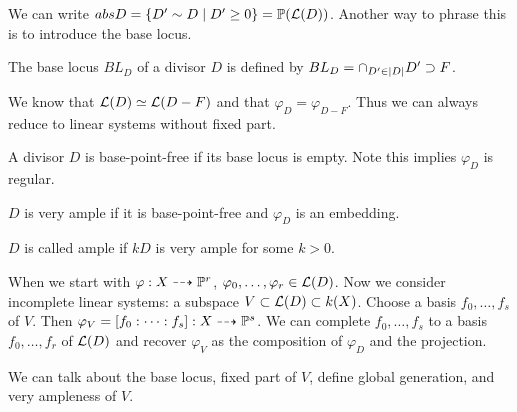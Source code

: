 \documentclass[twoside, 10pt]{article}
\begin{document}
        We can write $abs{D} = \{D' \sim D \mid D' \geq 0\} = \P(\mc{L}(D))$.
        Another way to phrase this is to introduce the base locus.

        \begin{defn} The base locus $BL_D$ of a divisor $D$ is
        defined by $BL_D = \cap_{D' \in \abs{D}} D' \supset F$.  \end{defn}
        
        We know that $\mc{L}(D) \simeq \mc{L}(D-F)$ and that $\varphi_D =
        \varphi_{D-F}$. Thus we can always reduce to linear systems without
        fixed part.

        \begin{defn} A divisor $D$ is base-point-free if its
        base locus is empty. Note this implies $\varphi_D$ is regular.
    \end{defn}

        \begin{defn} $D$ is very ample if it is base-point-free and
        $\varphi_D$ is an embedding.  \end{defn}

        \begin{defn}[Ample] $D$ is called ample if $kD$ is very ample for some
        $k > 0$.  \end{defn}

        When we start with $\varphi:X \dashrightarrow \P^r$, $\varphi_0,
        \ldots, \varphi_r \in \mc{L}(D)$. Now we consider incomplete linear
        systems: a subspace $V \subset \mc{L}(D) \subset k(X)$. Choose a basis
        $f_0, \ldots, f_s$ of $V$. Then $\varphi_V = [f_0: \cdots : f_s]: X
        \dashrightarrow \P^s$. We can complete $f_0, \ldots, f_s$ to a basis
        $f_0, \ldots, f_r$ of $\mc{L}(D)$ and recover $\varphi_V$ as the
        composition of $\varphi_D$ and the projection.

        We can talk about the base locus, fixed part of $V$, define global
        generation, and very ampleness of $V$.
\end{document}
